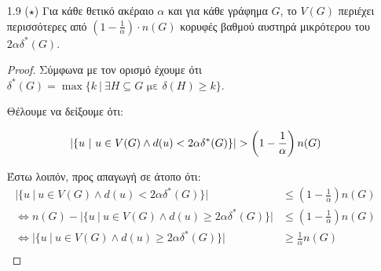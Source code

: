 \documentclass[a4paper, oneside, 11pt]{article}
\begin{document}
\begin{enumerate}
\begin{proof}
      \begin{align*}
         E[d] &= \frac{1}{{n(G) \choose 2}} \sum_{u, v \in V(G): u \neq v}
                  d(u, v)\\
              &= \frac{1}{{2^r \choose 2}} \sum_{u \in V(G)}
                  \sum_{v \in V(G): v \neq u} d(u, v)\\
              &= \frac{1}{\frac{2^r \cdot (2^r-1)}{2}}
                  \sum_{u \in V(G)} \sum_{k=1}^{r} k \cdot {r \choose k}\\
              &= \frac{2}{2^r (2^r - 1)} n(G) \sum_{k=1}^{r}
                  r {r-1 \choose k-1}\\
              &= \frac{2 \cdot 2^r \cdot r}{2^r (2^r - 1)} \sum_{k=0}^{r-1}
                  {r-1 \choose k}\\
              &= \frac{2 \cdot r \cdot 2^{r-1}}{2^r - 1}\\
              &= \frac{r \cdot 2^r}{2^r - 1}
      \end{align*}

   \end{proof}

\item[1.9 ($\star$)]
   Για κάθε θετικό ακέραιο $\alpha$ και για κάθε γράφημα $G$, το $V(G)$
   περιέχει περισσότερες από $\left( 1-\frac1\alpha \right) \cdot n(G)$
   κορυφές βαθμού αυστηρά μικρότερου του $2\alpha\delta^*(G)$.

   \begin{proof}
      Σύμφωνα με τον ορισμό έχουμε ότι
      $\delta^*(G) = \max \{ k\ |\ \exists H \subseteq G \text{ με }
       \delta(H) \geq k \}$.

      Θέλουμε να δείξουμε ότι:

      \[
         | \{ u\ |\ u \in V(G) \land d(u) < 2\alpha\delta^*(G) \} |
            > \left( 1 - \frac1\alpha \right) n(G)\\
      \]

      Έστω λοιπόν, προς απαγωγή σε άτοπο ότι:
      \begin{align*}
         | \{ u\ |\ u \in V(G) \land d(u) < 2\alpha\delta^*(G) \} |
            &\leq \left( 1 - \frac1\alpha \right) n(G)\\
         \Leftrightarrow
         n(G) - | \{ u\ |\ u \in V(G) \land d(u) \geq 2\alpha\delta^*(G) \} |
            &\leq \left( 1 - \frac1\alpha \right) n(G)\\ 
         \Leftrightarrow
         | \{ u\ |\ u \in V(G) \land d(u) \geq 2\alpha\delta^*(G) \} |
            &\geq \frac1\alpha n(G)\\
      \end{align*}


\end{proof}
\end{enumerate}
\end{document}
